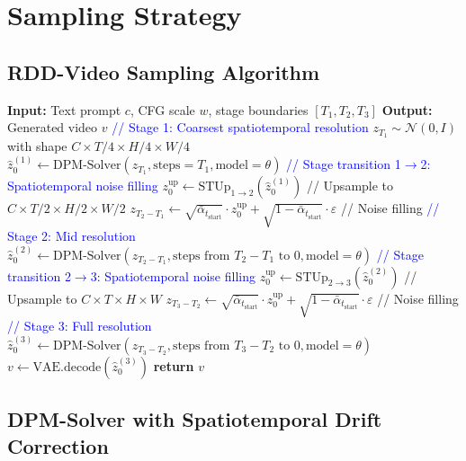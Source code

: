 \documentclass[11pt,a4paper]{article}
\begin{document}
\section{Sampling Strategy}

\subsection{RDD-Video Sampling Algorithm}

\begin{algorithm}[h]
\caption{RDD-Video Sampling (3 stages)}
\begin{algorithmic}[1]
\STATE \textbf{Input:} Text prompt $c$, CFG scale $w$, stage boundaries $[T_1, T_2, T_3]$
\STATE \textbf{Output:} Generated video $v$
\STATE
\STATE \textcolor{blue}{// Stage 1: Coarsest spatiotemporal resolution}
\STATE $z_{T_1} \sim \mathcal{N}(0, I)$ with shape $C \times T/4 \times H/4 \times W/4$
\STATE $\hat{z}_0^{(1)} \leftarrow \text{DPM-Solver}(z_{T_1}, \text{steps}=T_1, \text{model}=\theta)$
\STATE
\STATE \textcolor{blue}{// Stage transition 1$\to$2: Spatiotemporal noise filling}
\STATE $z_0^\text{up} \leftarrow \text{STUp}_{1\to2}(\hat{z}_0^{(1)})$ \quad // Upsample to $C \times T/2 \times H/2 \times W/2$
\STATE $z_{T_2-T_1} \leftarrow \sqrt{\bar\alpha_{t_\text{start}}} \cdot z_0^\text{up} + \sqrt{1-\bar\alpha_{t_\text{start}}} \cdot \varepsilon$ \quad // Noise filling
\STATE
\STATE \textcolor{blue}{// Stage 2: Mid resolution}
\STATE $\hat{z}_0^{(2)} \leftarrow \text{DPM-Solver}(z_{T_2-T_1}, \text{steps from } T_2-T_1 \text{ to } 0, \text{model}=\theta)$
\STATE
\STATE \textcolor{blue}{// Stage transition 2$\to$3: Spatiotemporal noise filling}
\STATE $z_0^\text{up} \leftarrow \text{STUp}_{2\to3}(\hat{z}_0^{(2)})$ \quad // Upsample to $C \times T \times H \times W$
\STATE $z_{T_3-T_2} \leftarrow \sqrt{\bar\alpha_{t_\text{start}}} \cdot z_0^\text{up} + \sqrt{1-\bar\alpha_{t_\text{start}}} \cdot \varepsilon$ \quad // Noise filling
\STATE
\STATE \textcolor{blue}{// Stage 3: Full resolution}
\STATE $\hat{z}_0^{(3)} \leftarrow \text{DPM-Solver}(z_{T_3-T_2}, \text{steps from } T_3-T_2 \text{ to } 0, \text{model}=\theta)$
\STATE
\STATE $v \leftarrow \text{VAE.decode}(\hat{z}_0^{(3)})$
\STATE \textbf{return} $v$
\end{algorithmic}
\end{algorithm}

\subsection{DPM-Solver with Spatiotemporal Drift Correction}
\end{document}
